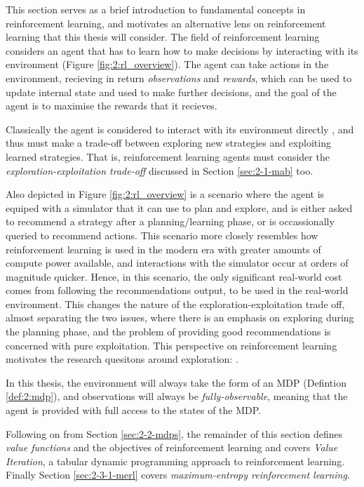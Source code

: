     This section serves as a brief introduction to fundamental concepts in reinforcement learning, and motivates an alternative lens on reinforcement learning that this thesis will consider. The field of reinforcement learning considers an agent that has to learn how to make decisions by interacting with its environment (Figure \ref{fig:2:rl_overview}). The agent can take actions in the environment, recieving in return \textit{observations} and \textit{rewards}, which can be used to update internal state and used to make further decisions, and the goal of the agent is to maximise the rewards that it recieves.

    Classically the agent is considered to interact with its environment directly \cite{sutton}, and thus must make a trade-off between exploring new strategies and exploiting learned strategies. That is, reinforcement learning agents must consider the \textit{exploration-exploitation trade-off} discussed in Section \ref{sec:2-1-mab} too. 

    Also depicted in Figure \ref{fig:2:rl_overview} is a scenario where the agent is equiped with a simulator that it can use to plan and explore, and is either asked to recommend a strategy after a planning/learning phase, or is occassionally queried to recommend actions. This scenario more closely resembles how reinforcement learning is used in the modern era with greater amounts of compute power available, and interactions with the simulator occur at orders of magnitude quicker. Hence, in this scenario, the only significant real-world cost comes from following the recommendations output, to be used in the real-world environment. This changes the nature of the exploration-exploitation trade off, almost separating the two issues, where there is an emphasis on exploring during the planning phase, and the problem of providing good recommendations is concerned with pure exploitation. This perspective on reinforcement learning motivates the research quesitons around exploration: \exploreq. 

    In this thesis, the environment will always take the form of an MDP (Defintion \ref{def:2:mdp}), and observations will always be \textit{fully-observable}, meaning that the agent is provided with full access to the states of the MDP. 

    Following on from Section \ref{sec:2-2-mdps}, the remainder of this section defines \textit{value functions} and the objectives of reinforcement learning and covers \textit{Value Iteration}, a tabular dynamic programming approach to reinforcement learning. Finally Section \ref{sec:2-3-1-merl} covers \textit{maximum-entropy reinforcement learning}.
    
